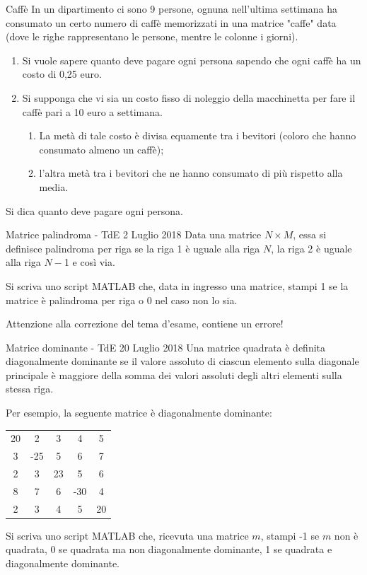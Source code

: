 \documentclass[format=169, handout]{beamer}
\begin{document}
\begin{frame}{Caffè}
In un dipartimento ci sono 9 persone, ognuna nell'ultima settimana ha
consumato un certo numero di caffè memorizzati in una matrice "caffe" data
(dove le righe rappresentano le persone, mentre le colonne i giorni).
\begin{enumerate}
	\item Si vuole sapere quanto deve pagare ogni persona sapendo che ogni caffè
	ha un costo di 0,25 euro.
	\item Si supponga che vi sia un costo fisso di noleggio della macchinetta per
	fare il caffè pari a 10 euro a settimana.
	\begin{enumerate}
		\item  La metà di tale costo è divisa equamente tra i bevitori (coloro che
		hanno consumato almeno un caffè);
		\item l'altra metà tra i bevitori che ne hanno consumato di più rispetto
		alla media.
	\end{enumerate}
\end{enumerate}

Si dica quanto deve pagare ogni persona.
\end{frame}

\begin{frame}{Matrice palindroma - TdE 2 Luglio 2018}
Data una matrice $N \times M$, essa si definisce palindroma per riga se la riga 1 è uguale alla riga $N$, la riga 2 è uguale alla riga $N-­$1 e così via.
  
Si scriva uno script MATLAB che, data in ingresso una matrice, stampi 1 se la matrice è palindroma per riga o 0 nel caso non lo sia.

Attenzione alla correzione del tema d'esame, contiene un errore!
\end{frame}

\begin{frame}{Matrice dominante - TdE 20 Luglio 2018}
Una matrice quadrata è definita diagonalmente dominante se il valore assoluto di ciascun elemento sulla  
diagonale principale è maggiore della somma dei valori assoluti degli altri elementi sulla stessa riga.

Per esempio, la seguente matrice è diagonalmente dominante:
\begin{tabular}{ccccc}	 
	20 & 2 & 3 & 4 & 5 \\ 	 
	3 & -25 & 5 & 6 & 7 \\ 
	2 & 3 & 23 & 5 & 6 \\  
	8 & 7 & 6 & -30 & 4 \\ 
	2 & 3 & 4 & 5 & 20 \\  
\end{tabular} 

Si scriva uno script MATLAB che, ricevuta una matrice $m$, stampi -1 se $m$ non è quadrata, 0 se quadrata ma non diagonalmente dominante, 1 se quadrata e diagonalmente dominante.
\end{frame}
\end{document}
